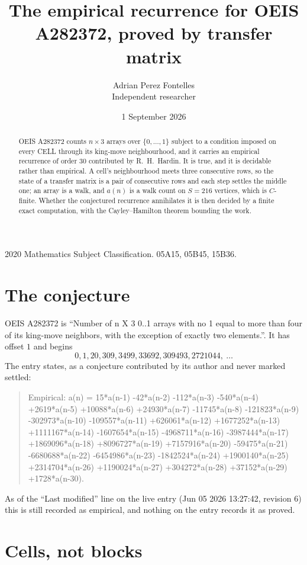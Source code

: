 \documentclass[11pt,a4paper]{article}
\title{The empirical recurrence for OEIS A282372, proved by transfer matrix}
\author{Adrian Perez Fontelles\\ \small Independent researcher}
\date{1 September 2026}
\theoremstyle{plain}
\theoremstyle{definition}
\begin{document}
\maketitle

\begin{abstract}
OEIS A282372 counts $n\times3$ arrays over $\{0,\dots,1\}$ subject to a condition imposed on
every CELL through its king-move neighbourhood, and it carries an empirical recurrence of
order $30$ contributed by R.~H.~Hardin. It is true, and it is decidable rather than
empirical. A cell's neighbourhood meets three consecutive rows, so the state of a transfer
matrix is a pair of consecutive rows and each step settles the middle one; an array is a
walk, and $a(n)$ is a walk count on $S=216$ vertices, which is $C$-finite. Whether the
conjectured recurrence annihilates it is then decided by a finite exact computation, with the
Cayley--Hamilton theorem bounding the work.
\end{abstract}

\noindent\small 2020 Mathematics Subject Classification. 05A15, 05B45, 15B36.\normalsize

\section{The conjecture}

OEIS A282372 is ``Number of n X 3 0..1 arrays with no 1 equal to more than four of its king-move neighbors, with the exception of exactly two elements.''. It has offset $1$ and begins
\[
0, 1, 20, 309, 3499, 33692, 309493, 2721044,\ \dots
\]
The entry states, as a conjecture contributed by its author and never marked settled:
\begin{quote}
Empirical: a(n) = 15*a(n-1) -42*a(n-2) -112*a(n-3) -540*a(n-4) +2619*a(n-5) +10088*a(n-6) +24930*a(n-7) -11745*a(n-8) -121823*a(n-9) -302973*a(n-10) -109557*a(n-11) +626061*a(n-12) +1677252*a(n-13) +1111167*a(n-14) -1607654*a(n-15) -4968711*a(n-16) -3987444*a(n-17) +1869096*a(n-18) +8096727*a(n-19) +7157916*a(n-20) -59475*a(n-21) -6680688*a(n-22) -6454986*a(n-23) -1842524*a(n-24) +1900140*a(n-25) +2314704*a(n-26) +1190024*a(n-27) +304272*a(n-28) +37152*a(n-29) +1728*a(n-30).
\end{quote}
As of the ``Last modified'' line on the live entry (Jun 05 2026 13:27:42, revision 6) this is still
recorded as empirical, and nothing on the entry records it as proved.

\section{Cells, not blocks}
\end{document}
